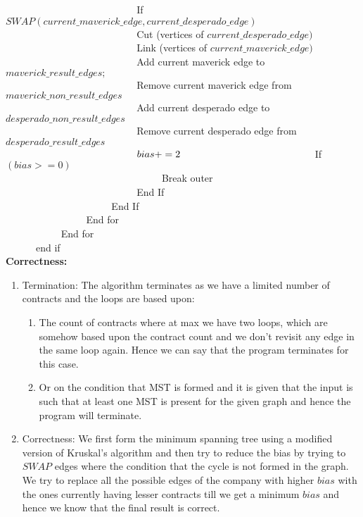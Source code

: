\documentclass[12pt]{article}
\begin{document}
\begin{enumerate}
\verb|		|\verb|		|\verb|		|\verb|		|\verb|		|If $SWAP(current\_maverick\_edge, current\_desperado\_edge)$\\
\verb|		|\verb|		|\verb|		|\verb|		|\verb|		|Cut (vertices of $current\_desperado\_edge)$\\
\verb|		|\verb|		|\verb|		|\verb|		|\verb|		|Link (vertices of $current\_maverick\_edge)$\\
\verb|		|\verb|		|\verb|		|\verb|		|\verb|		|Add current maverick edge to $maverick\_result\_edges;$\\
\verb|		|\verb|		|\verb|		|\verb|		|\verb|		|Remove current maverick edge from $maverick\_non\_result\_edges$\\
\verb|		|\verb|		|\verb|		|\verb|		|\verb|		|Add current desperado edge to $desperado\_non\_result\_edges$\\
\verb|		|\verb|		|\verb|		|\verb|		|\verb|		|Remove current desperado edge from $desperado\_result\_edges$\\
\verb|		|\verb|		|\verb|		|\verb|		|\verb|		|$bias +=2\\$
\verb|		|\verb|		|\verb|		|\verb|		|\verb|		|If $(bias >=0)$\\
\verb|		|\verb|		|\verb|		|\verb|		|\verb|		|\verb|		|Break outer\\
\verb|		|\verb|		|\verb|		|\verb|		|\verb|		|End If\\
\verb|		|\verb|		|\verb|		|\verb|		|End If\\
\verb|		|\verb|		|\verb|		|End for\\
\verb|		|\verb|		|End for\\
\verb|		|end if\\

\textbf{Correctness:}
\begin{enumerate}
	\item Termination:
	The algorithm terminates as we have a limited number of contracts and the loops are based upon: 
	\begin{enumerate}
		\item The count of contracts where at max we have two loops, which are somehow based upon the contract count and we don’t revisit any edge in the same loop again. Hence we can say that the program terminates for this case.
		\item Or on the condition that MST is formed and it is given that the input is such that at least one MST is present for the given graph and hence the program will terminate.
	\end{enumerate}
	\item Correctness: We first form the minimum spanning tree using a modified version of Kruskal’s algorithm and then try to reduce the bias by trying to $SWAP$ edges where the condition that the cycle is not formed in the graph. We try to replace all the possible edges of the company with higher $bias$ with the ones currently having lesser contracts till we get a minimum $bias$ and hence we know that the final result is correct.
\end{enumerate} 


\end{enumerate}
\end{document}
